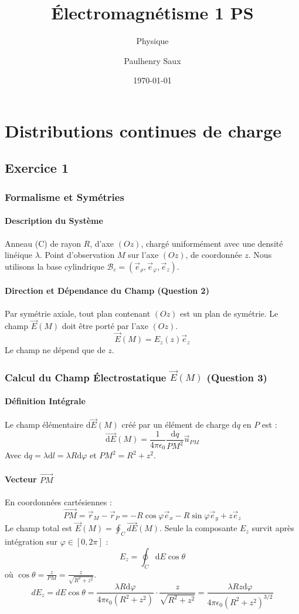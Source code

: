 \documentclass[french]{yLectureNote}
\title{Électromagnétisme 1 PS}
\subtitle{Physique}
\author{Paulhenry Saux}
\date{\today}
\renewcommand{\vec}{\overrightarrow}
\newcommand{\dd}{\mathrm{d}}
\begin{document}
\setcounter{chapter}{3}
\chapter{Distributions continues de charge}
\section{Exercice 1}
\subsection{Formalisme et Symétries}

\subsubsection{Description du Système}
Anneau (C) de rayon $R$, d'axe $(Oz)$, chargé uniformément avec une densité linéique $\lambda$.
Point d'observation $M$ sur l'axe $(Oz)$, de coordonnée $z$.
Nous utilisons la base cylindrique $\mathcal{B}_c = (\vec{e}_\rho, \vec{e}_\varphi, \vec{e}_z)$.

\subsubsection{Direction et Dépendance du Champ (Question 2)}
Par symétrie axiale, tout plan contenant $(Oz)$ est un plan de symétrie. Le champ $\vec{E}(M)$ doit être porté par l'axe $(Oz)$.
$$\vec{E}(M) = E_z(z) \vec{e}_z$$
Le champ ne dépend que de $z$.

\subsection{Calcul du Champ Électrostatique $\vec{E}(M)$ (Question 3)}

\subsubsection{Définition Intégrale}
Le champ élémentaire $\dd \vec{E}(M)$ créé par un élément de charge $\dd q$ en $P$ est :
$$\overrightarrow{\dd E}(M) = \frac{1}{4\pi\epsilon_0} \frac{\dd q}{PM^2} \vec{u}_{PM}$$
Avec $\dd q = \lambda \dd l = \lambda R \dd \varphi$ et $PM^2 = R^2 + z^2$.

\subsubsection{Vecteur $\overrightarrow{PM}$}
En coordonnées cartésiennes :
$$\overrightarrow{PM} = \vec{r}_M - \vec{r}_P = -R \cos\varphi \vec{e}_x - R \sin\varphi \vec{e}_y + z \vec{e}_z$$
Le champ total est $\vec{E}(M) = \oint_C \overrightarrow{dE}(M)$. Seule la composante $E_z$ survit après intégration sur $\varphi \in [0, 2\pi]$ :
$$E_z = \oint_C \dd E \cos\theta$$
où $\cos\theta = \frac{z}{PM} = \frac{z}{\sqrt{R^2 + z^2}}$.
$$dE_z = dE \cos\theta = \frac{\lambda R \dd \varphi}{4\pi\epsilon_0 (R^2 + z^2)} \cdot \frac{z}{\sqrt{R^2 + z^2}} = \frac{\lambda R z \dd \varphi}{4\pi\epsilon_0 (R^2 + z^2)^{3/2}}$$
\end{document}
